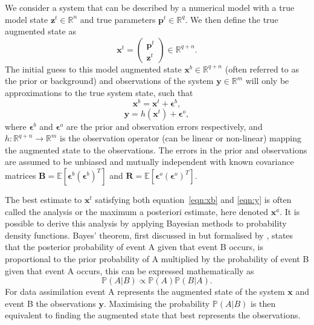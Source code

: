 \documentclass[12pt]{article}
\begin{document}
We consider a system that can be described by a numerical model with a true model state \(\textbf{z}^{t} \in \mathbb{R}^{n}\) and true parameters \(\textbf{p}^{t} \in \mathbb{R}^{q}\). We then define the true augmented state as
\begin{equation}
\textbf{x}^{t} =
\begin{pmatrix}
\textbf{p}^{t} \\
\textbf{z}^{t}
\end{pmatrix}
\in \mathbb{R}^{q+n}.
\end{equation}
The initial guess to this model augmented state \(\textbf{x}^{b} \in \mathbb{R}^{q+n}\) (often referred to as the prior or background) and observations of the system \(\textbf{y} \in \mathbb{R}^{m}\) will only be approximations to the true system state, such that
\begin{equation}
\textbf{x}^{b} = \textbf{x}^{t} + \bm{\epsilon}^{b}, \label{eqn:xb}
\end{equation} 
\begin{equation}
\textbf{y} = h(\textbf{x}^{t}) + \bm{\epsilon}^{o}, \label{eqn:y}
\end{equation} 
where \( \bm{\epsilon}^{b}\) and \( \bm{\epsilon}^{o}\) are the prior and observation errors respectively, and \(h: \mathbb{R}^{q+n}\rightarrow \mathbb{R}^{m}\) is the observation operator (can be linear or non-linear) mapping the augmented state to the observations. The errors in the prior and observations are assumed to be unbiased and mutually independent with known covariance matrices \(\textbf{B} = \mathbb{E}[\bm{\epsilon}^{b}(\bm{\epsilon}^{b})^{T}]\) and \(\textbf{R} = \mathbb{E}[\bm{\epsilon}^{o}(\bm{\epsilon}^{o})^{T}]\).

The best estimate to \(\textbf{x}^{t}\) satisfying both equation~\eqref{eqn:xb} and \eqref{eqn:y} is often called the analysis or the maximum a posteriori estimate, here denoted \(\textbf{x}^{a}\). It is possible to derive this analysis by applying Bayesian methods to probability density functions. Bayes' theorem, first discussed in \citet{mr1763essay} but formalised by \citet{laplace1781memoire}, states that the posterior probability of event A given that event B occurs, is proportional to the prior probability of A multiplied by the probability of event B given that event A occurs, this can be expressed mathematically as
\begin{equation}
\mathbb{P}(A|B) \propto \mathbb{P}(A)\mathbb{P}(B|A). \label{eqn:bayes}
\end{equation}
For data assimilation event A represents the augmented state of the system \(\textbf{x}\) and event B the observations \(\textbf{y}\). Maximising the probability \(\mathbb{P}(A|B)\) is then equivalent to finding the augmented state that best represents the observations. 
\end{document}
